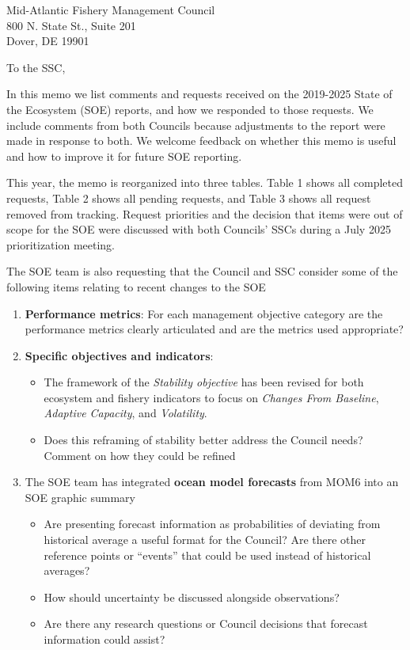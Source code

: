 \documentclass[10pt,]{letter}
\date{31 March, 2026}
\providecommand{\tightlist}{%
  \setlength{\itemsep}{0pt}\setlength{\parskip}{0pt}}
\begin{document}
\begin{letter}{Mid-Atlantic Fishery Management Council\\800 N. State
St., Suite 201\\Dover, DE 19901}
\opening{To the SSC,}

In this memo we list comments and requests received on the 2019-2025
State of the Ecosystem (SOE) reports, and how we responded to those
requests. We include comments from both Councils because adjustments to
the report were made in response to both. We welcome feedback on whether
this memo is useful and how to improve it for future SOE reporting.

This year, the memo is reorganized into three tables. Table 1 shows all
completed requests, Table 2 shows all pending requests, and Table 3
shows all request removed from tracking. Request priorities and the
decision that items were out of scope for the SOE were discussed with
both Councils' SSCs during a July 2025 prioritization meeting.

The SOE team is also requesting that the Council and SSC consider some
of the following items relating to recent changes to the SOE

\begin{enumerate}
\def\labelenumi{\arabic{enumi}.}
\item
  \textbf{Performance metrics}: For each management objective category
  are the performance metrics clearly articulated and are the metrics
  used appropriate?
\item
  \textbf{Specific objectives and indicators}:

  \begin{itemize}
  \tightlist
  \item
    The framework of the \emph{Stability objective} has been revised for
    both ecosystem and fishery indicators to focus on \emph{Changes From
    Baseline}, \emph{Adaptive Capacity}, and \emph{Volatility}.
  \item
    Does this reframing of stability better address the Council needs?
    Comment on how they could be refined
  \end{itemize}
\item
  The SOE team has integrated \textbf{ocean model forecasts} from MOM6
  into an SOE graphic summary

  \begin{itemize}
  \tightlist
  \item
    Are presenting forecast information as probabilities of deviating
    from historical average a useful format for the Council? Are there
    other reference points or ``events'' that could be used instead of
    historical averages?
  \item
    How should uncertainty be discussed alongside observations?
  \item
    Are there any research questions or Council decisions that forecast
    information could assist?
  \end{itemize}
\end{enumerate}


\end{letter}
\end{document}
